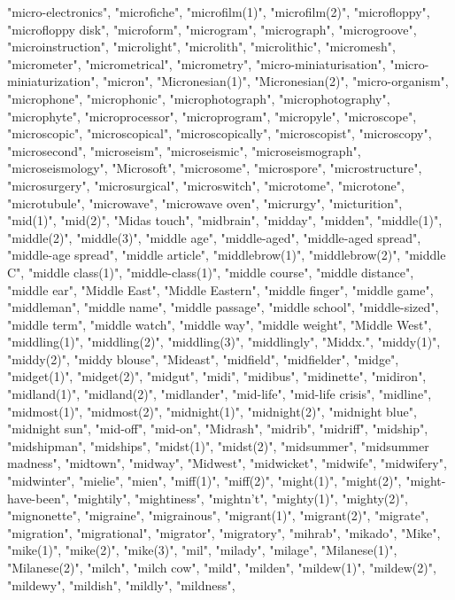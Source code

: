 "micro-electronics",
"microfiche",
"microfilm(1)",
"microfilm(2)",
"microfloppy",
"microfloppy disk",
"microform",
"microgram",
"micrograph",
"microgroove",
"microinstruction",
"microlight",
"microlith",
"microlithic",
"micromesh",
"micrometer",
"micrometrical",
"micrometry",
"micro-miniaturisation",
"micro-miniaturization",
"micron",
"Micronesian(1)",
"Micronesian(2)",
"micro-organism",
"microphone",
"microphonic",
"microphotograph",
"microphotography",
"microphyte",
"microprocessor",
"microprogram",
"micropyle",
"microscope",
"microscopic",
"microscopical",
"microscopically",
"microscopist",
"microscopy",
"microsecond",
"microseism",
"microseismic",
"microseismograph",
"microseismology",
"Microsoft",
"microsome",
"microspore",
"microstructure",
"microsurgery",
"microsurgical",
"microswitch",
"microtome",
"microtone",
"microtubule",
"microwave",
"microwave oven",
"micrurgy",
"micturition",
"mid(1)",
"mid(2)",
"Midas touch",
"midbrain",
"midday",
"midden",
"middle(1)",
"middle(2)",
"middle(3)",
"middle age",
"middle-aged",
"middle-aged spread",
"middle-age spread",
"middle article",
"middlebrow(1)",
"middlebrow(2)",
"middle C",
"middle class(1)",
"middle-class(1)",
"middle course",
"middle distance",
"middle ear",
"Middle East",
"Middle Eastern",
"middle finger",
"middle game",
"middleman",
"middle name",
"middle passage",
"middle school",
"middle-sized",
"middle term",
"middle watch",
"middle way",
"middle weight",
"Middle West",
"middling(1)",
"middling(2)",
"middling(3)",
"middlingly",
"Middx.",
"middy(1)",
"middy(2)",
"middy blouse",
"Mideast",
"midfield",
"midfielder",
"midge",
"midget(1)",
"midget(2)",
"midgut",
"midi",
"midibus",
"midinette",
"midiron",
"midland(1)",
"midland(2)",
"midlander",
"mid-life",
"mid-life crisis",
"midline",
"midmost(1)",
"midmost(2)",
"midnight(1)",
"midnight(2)",
"midnight blue",
"midnight sun",
"mid-off",
"mid-on",
"Midrash",
"midrib",
"midriff",
"midship",
"midshipman",
"midships",
"midst(1)",
"midst(2)",
"midsummer",
"midsummer madness",
"midtown",
"midway",
"Midwest",
"midwicket",
"midwife",
"midwifery",
"midwinter",
"mielie",
"mien",
"miff(1)",
"miff(2)",
"might(1)",
"might(2)",
"might-have-been",
"mightily",
"mightiness",
"mightn't",
"mighty(1)",
"mighty(2)",
"mignonette",
"migraine",
"migrainous",
"migrant(1)",
"migrant(2)",
"migrate",
"migration",
"migrational",
"migrator",
"migratory",
"mihrab",
"mikado",
"Mike",
"mike(1)",
"mike(2)",
"mike(3)",
"mil",
"milady",
"milage",
"Milanese(1)",
"Milanese(2)",
"milch",
"milch cow",
"mild",
"milden",
"mildew(1)",
"mildew(2)",
"mildewy",
"mildish",
"mildly",
"mildness",
